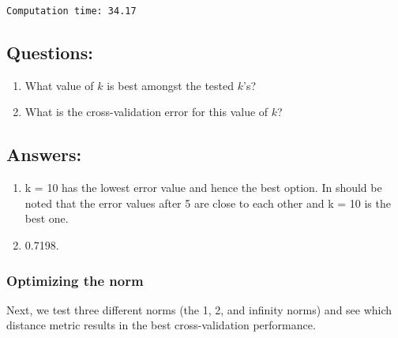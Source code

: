 \documentclass[11pt]{article}
\begin{document}
    \begin{Verbatim}[commandchars=\\\{\}]
Computation time: 34.17

    \end{Verbatim}

    \hypertarget{questions}{%
\subsection{Questions:}\label{questions}}

\begin{enumerate}
\def\labelenumi{(\arabic{enumi})}
\item
  What value of \(k\) is best amongst the tested \(k\)'s?
\item
  What is the cross-validation error for this value of \(k\)?
\end{enumerate}

    \hypertarget{answers}{%
\subsection{Answers:}\label{answers}}

\begin{enumerate}
\def\labelenumi{(\arabic{enumi})}
\item
  k = 10 has the lowest error value and hence the best option. In should
  be noted that the error values after 5 are close to each other and k =
  10 is the best one.
\item
  0.7198.
\end{enumerate}

    \hypertarget{optimizing-the-norm}{%
\subsubsection{Optimizing the norm}\label{optimizing-the-norm}}

Next, we test three different norms (the 1, 2, and infinity norms) and
see which distance metric results in the best cross-validation
performance.
\end{document}
